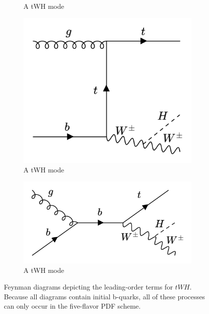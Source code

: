 \begin{figure}[htp]
\begin{subfigure}[b]{0.3\textwidth}
         \caption{A tWH mode}
         \label{fig:tWH3}
     \end{subfigure}
     \hfill
         \begin{subfigure}[b]{0.3\textwidth}
         \centering
         \includegraphics[width=\textwidth]{figures/theory_chapter/tWH4.png}
         \caption{A tWH mode}
         \label{fig:tWH4}
     \end{subfigure}
     \hfill
         \begin{subfigure}[b]{0.3\textwidth}
         \centering
         \includegraphics[width=\textwidth]{figures/theory_chapter/tWH5.png}
         \caption{A tWH mode}
         \label{fig:tWH5}
     \end{subfigure}
  \label{fig:tWHmodes}
  \caption{Feynman diagrams depicting the leading-order terms for $tWH$. Because all diagrams contain initial b-quarks, all of these processes can only occur in the five-flavor PDF scheme.}  
\end{figure}

